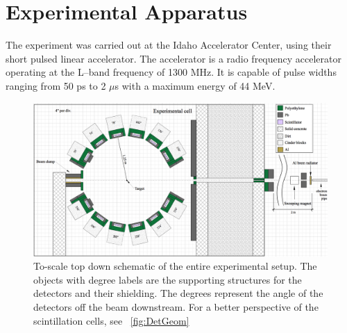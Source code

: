 
\section{Experimental Apparatus}
The experiment was carried out at the Idaho Accelerator Center, using their short pulsed linear accelerator. The accelerator is a radio frequency accelerator operating at the L--band frequency of 1300 MHz. It is capable of pulse widths ranging from 50 ps to 2 $\mu$s with a maximum energy of 44 MeV.



\begin{figure}[h]
\includegraphics[width=\textwidth]{Content/Methods/ExpArangment.png}
\caption{To-scale top down schematic of the entire experimental setup. The objects with degree labels are the supporting structures for the detectors and their shielding. The degrees represent the angle of the detectors off the beam downstream. For a better perspective of the scintillation cells, see ~\ref{fig:DetGeom}}
\label{fig:Facility}
\end{figure}

